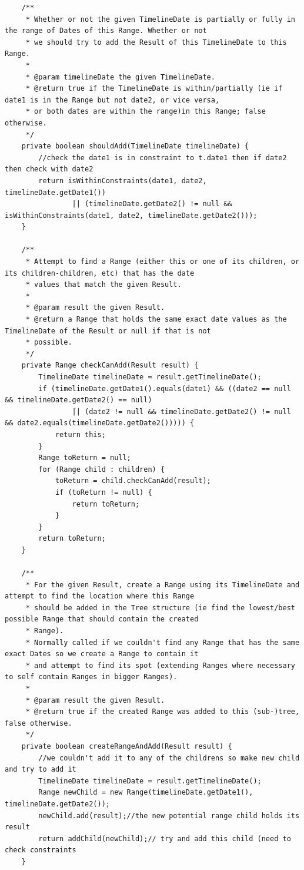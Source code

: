 \begin{lstlisting}
    /**
     * Whether or not the given TimelineDate is partially or fully in the range of Dates of this Range. Whether or not
     * we should try to add the Result of this TimelineDate to this Range.
     *
     * @param timelineDate the given TimelineDate.
     * @return true if the TimelineDate is within/partially (ie if date1 is in the Range but not date2, or vice versa,
     * or both dates are within the range)in this Range; false otherwise.
     */
    private boolean shouldAdd(TimelineDate timelineDate) {
        //check the date1 is in constraint to t.date1 then if date2 then check with date2
        return isWithinConstraints(date1, date2, timelineDate.getDate1())
                || (timelineDate.getDate2() != null && isWithinConstraints(date1, date2, timelineDate.getDate2()));
    }

    /**
     * Attempt to find a Range (either this or one of its children, or its children-children, etc) that has the date
     * values that match the given Result.
     *
     * @param result the given Result.
     * @return a Range that holds the same exact date values as the TimelineDate of the Result or null if that is not
     * possible.
     */
    private Range checkCanAdd(Result result) {
        TimelineDate timelineDate = result.getTimelineDate();
        if (timelineDate.getDate1().equals(date1) && ((date2 == null && timelineDate.getDate2() == null)
                || (date2 != null && timelineDate.getDate2() != null && date2.equals(timelineDate.getDate2())))) {
            return this;
        }
        Range toReturn = null;
        for (Range child : children) {
            toReturn = child.checkCanAdd(result);
            if (toReturn != null) {
                return toReturn;
            }
        }
        return toReturn;
    }

    /**
     * For the given Result, create a Range using its TimelineDate and attempt to find the location where this Range
     * should be added in the Tree structure (ie find the lowest/best possible Range that should contain the created
     * Range).
     * Normally called if we couldn't find any Range that has the same exact Dates so we create a Range to contain it
     * and attempt to find its spot (extending Ranges where necessary to self contain Ranges in bigger Ranges).
     *
     * @param result the given Result.
     * @return true if the created Range was added to this (sub-)tree, false otherwise.
     */
    private boolean createRangeAndAdd(Result result) {
        //we couldn't add it to any of the childrens so make new child and try to add it
        TimelineDate timelineDate = result.getTimelineDate();
        Range newChild = new Range(timelineDate.getDate1(), timelineDate.getDate2());
        newChild.add(result);//the new potential range child holds its result
        return addChild(newChild);// try and add this child (need to check constraints
    }



\end{lstlisting}
